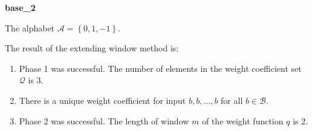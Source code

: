 \begin{exmp}
\textbf{ base\_2 }

\label{ex:base2}

The alphabet $\mathcal{A} =\left\{0, 1, -1\right\}$.

The result of the extending window method is:
\begin{enumerate}
    \item Phase 1 was successful.
The number of elements in the weight coefficient set $\mathcal{Q}$ is $3$.

    \item There is a unique weight coefficient for input $b,b,\dots,b$ for all $b\in\mathcal{B}$.

    \item Phase 2 was successful.
The length of window $m$ of the weight function $q$ is 2.
\end{enumerate}
\end{exmp}
